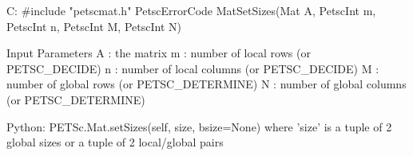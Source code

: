 C:
#include "petscmat.h"
PetscErrorCode MatSetSizes(Mat A,
    PetscInt m, PetscInt n, PetscInt M, PetscInt N)

Input Parameters
A : the matrix
m : number of local rows (or PETSC_DECIDE)
n : number of local columns (or PETSC_DECIDE)
M : number of global rows (or PETSC_DETERMINE)
N : number of global columns (or PETSC_DETERMINE)
    
Python:
PETSc.Mat.setSizes(self, size, bsize=None)
where 'size' is a tuple of 2 global sizes
or a tuple of 2 local/global pairs
